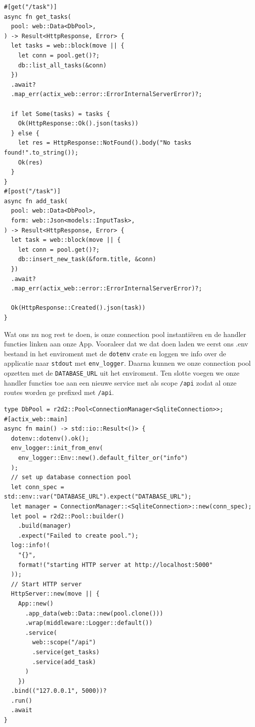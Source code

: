 \begin{listing}[h]
\begin{verbatim}
#[get("/task")]
async fn get_tasks(
  pool: web::Data<DbPool>,
) -> Result<HttpResponse, Error> {
  let tasks = web::block(move || {
    let conn = pool.get()?;
    db::list_all_tasks(&conn)
  })
  .await?
  .map_err(actix_web::error::ErrorInternalServerError)?;

  if let Some(tasks) = tasks {
    Ok(HttpResponse::Ok().json(tasks))
  } else {
    let res = HttpResponse::NotFound().body("No tasks found!".to_string());
    Ok(res)
  }
}
#[post("/task")]
async fn add_task(
  pool: web::Data<DbPool>,
  form: web::Json<models::InputTask>,
) -> Result<HttpResponse, Error> {
  let task = web::block(move || {
    let conn = pool.get()?;
    db::insert_new_task(&form.title, &conn)
  })
  .await?
  .map_err(actix_web::error::ErrorInternalServerError)?;

  Ok(HttpResponse::Created().json(task))
}
\end{verbatim}
\caption{handler.rs}
\end{listing}

\clearpage

Wat ons nu nog rest te doen, is onze connection pool instantiëren en de handler functies linken aan
onze App. Vooraleer dat we dat doen laden we eerst ons .env bestand in het enviroment met de
\texttt{dotenv} crate en loggen we info over de applicatie naar \texttt{stdout}
met \texttt{env_logger}. Daarna kunnen we onze connection pool opzetten met de
\texttt{DATABASE_URL} uit het enviroment. Ten slotte voegen we onze handler functies toe
aan een nieuwe service met als scope \texttt{/api} zodat al onze routes worden ge prefixed
met \texttt{/api}.

\begin{listing}[h]
\begin{verbatim}
type DbPool = r2d2::Pool<ConnectionManager<SqliteConnection>>;
#[actix_web::main]
async fn main() -> std::io::Result<()> {
  dotenv::dotenv().ok();
  env_logger::init_from_env(
    env_logger::Env::new().default_filter_or("info")
  );
  // set up database connection pool
  let conn_spec = std::env::var("DATABASE_URL").expect("DATABASE_URL");
  let manager = ConnectionManager::<SqliteConnection>::new(conn_spec);
  let pool = r2d2::Pool::builder()
    .build(manager)
    .expect("Failed to create pool.");
  log::info!(
    "{}",
    format!("starting HTTP server at http://localhost:5000"
  ));
  // Start HTTP server
  HttpServer::new(move || {
    App::new()
      .app_data(web::Data::new(pool.clone()))
      .wrap(middleware::Logger::default())
      .service(
        web::scope("/api")
        .service(get_tasks)
        .service(add_task)
      )
    })
  .bind(("127.0.0.1", 5000))?
  .run()
  .await
}
\end{verbatim}
\caption{main.rs}
\end{listing}


